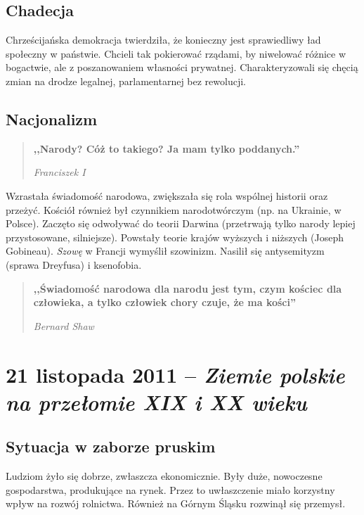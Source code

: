 \documentclass [a4paper, 11pt, oneside]{book}
\begin{document}
    \section{Chadecja} %
    \label{sec:chadecja}
        Chrześcijańska demokracja twierdziła, że konieczny jest sprawiedliwy ład społeczny w państwie. Chcieli tak pokierować rządami, by niwelować różnice w bogactwie, ale z poszanowaniem własności prywatnej. Charakteryzowali się chęcią zmian na drodze legalnej, parlamentarnej bez rewolucji.
    \section{Nacjonalizm} %
    \label{sec:nacjonalizm}
        \begin{quote}
            \textbf{,,Narody? Cóż to takiego? Ja mam tylko poddanych.''}
        \begin{flushright}
            \emph{Franciszek I}
        \end{flushright}
        \end{quote}
        Wzrastała świadomość narodowa, zwiększała się rola wspólnej historii oraz przeżyć. Kościół również był czynnikiem narodotwórczym (np. na Ukrainie, w Polsce). Zaczęto się odwoływać do teorii Darwina (przetrwają tylko narody lepiej przystosowane, silniejsze). Powstały teorie krajów wyższych i niższych (Joseph Gobineau). \textit{Szowę} w Francji wymyślił szowinizm. Nasilił się antysemityzm (sprawa Dreyfusa) i ksenofobia.
        \begin{quote}
            \textbf{,,Świadomość narodowa dla narodu jest tym, czym kościec dla człowieka, a tylko człowiek chory czuje, że ma kości''}
        \begin{flushright}
            \emph{Bernard Shaw}
        \end{flushright}
        \end{quote}
\chapter{21 listopada 2011 -- \textit{Ziemie polskie na przełomie XIX i XX wieku}} %
\label{cha:21_listopada_2011_textit}
    \section{Sytuacja w zaborze pruskim} %
    \label{sec:sytuacja_w_zaborze_pruskim}
        Ludziom żyło się dobrze, zwłaszcza ekonomicznie. Były duże, nowoczesne gospodarstwa, produkujące na rynek. Przez to uwłaszczenie miało korzystny wpływ na rozwój rolnictwa. Również na Górnym Śląsku rozwinął się przemysł.
\end{document}
